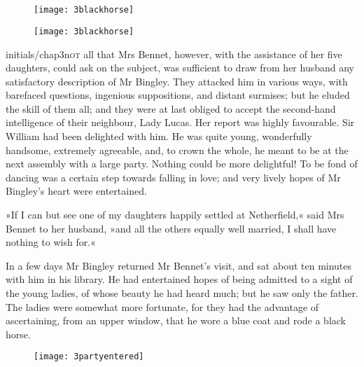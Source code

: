 
\chapter[Chapter \thechapter]{}
	
	 \makeatletter
{}
{%
	\begin{figure}[t!]
		\centering
		\texttt{[image: 3blackhorse]}
	\end{figure}
}{
	\begin{figure}[t!]
		\centering
		\texttt{[image: 3blackhorse]}
	\end{figure}
}

\makeatother

\lettrine[lines=6,image=true]{initials/chap3n}{ot} all that Mrs Bennet, however, with the assistance of her five daughters, could ask on the subject, was sufficient to draw from her husband any satisfactory description of Mr Bingley. They attacked him in various ways, with barefaced questions, ingenious suppositions, and distant surmises; but he eluded the skill of them all; and they were at last obliged to accept the second-hand intelligence of their neighbour, Lady Lucas. Her report was highly favourable. Sir William had been delighted with him. He was quite young, wonderfully handsome, extremely agreeable, and, to crown the whole, he meant to be at the next assembly with a large party. Nothing could be more delightful! To be fond of dancing was a certain step towards falling in love; and very lively hopes of Mr Bingley's heart were entertained.

»If I can but see one of my daughters happily settled at Netherfield,« said Mrs Bennet to her husband, »and all the others equally well married, I shall have nothing to wish for.«

In a few days Mr Bingley returned Mr Bennet's visit, and sat about ten minutes with him in his library. He had entertained hopes of being admitted to a sight of the young ladies, of whose beauty he had heard much; but he saw only the father. The ladies were somewhat more fortunate, for they had the advantage of ascertaining, from an upper window, that he wore a blue coat and rode a black horse.

\begin{figure}[tbh]
\centering
\texttt{[image: 3partyentered]}
\end{figure}

